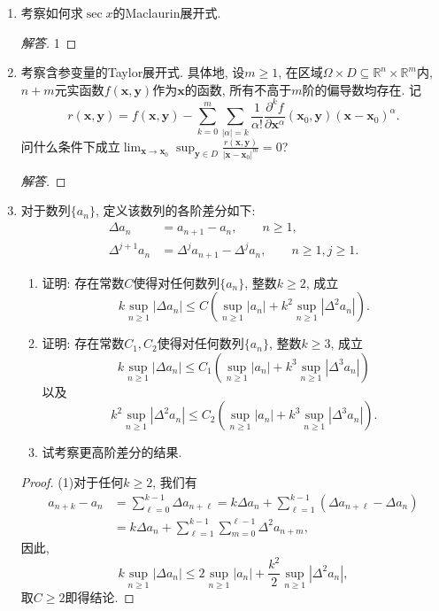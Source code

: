\begin{6b}
\begin{enumerate}
\item 考察如何求\(\sec x\)的Maclaurin展开式.
\begin{proof}[解答]
	1
\end{proof}
\item 考察含参变量的Taylor展开式. 具体地, 设\(m\geqslant 1\), 
在区域\(\varOmega\times D\subseteq\mathbb{R}^n\times\mathbb{R}^m\)内, 
\(n+m\)元实函数\(f(\boldsymbol{x},\boldsymbol{y})\)作为\(\boldsymbol{x}\)的函数, 
所有不高于\(m\)阶的偏导数均存在. 记
\[r(\boldsymbol{x},\boldsymbol{y})=f(\boldsymbol{x},\boldsymbol{y})-\sum_{k=0}^{m}\sum_{\left|\alpha\right|=k}\frac{1}{\alpha!}\frac{\partial^kf}{\partial\boldsymbol{x}^\alpha}(\boldsymbol{x}_0,\boldsymbol{y})(\boldsymbol{x}-\boldsymbol{x}_0)^\alpha.\]
问什么条件下成立\(\lim_{\boldsymbol{x}\rightarrow\boldsymbol{x}_0}\sup_{\boldsymbol{y}\in D}\frac{r(\boldsymbol{x},\boldsymbol{y})}{|\boldsymbol{x}-\boldsymbol{x}_0|^m}=0\)?
\begin{proof}[解答]
	
\end{proof}
\item 对于数列\(\{a_n\}\), 定义该数列的各阶差分如下:
\[\begin{split}
\Delta a_n&=a_{n+1}-a_n,\qquad n\geqslant 1,\\
\Delta^{j+1}a_n&=\Delta^{j}a_{n+1}-\Delta^{j}a_n,\qquad n\geqslant1,j\geqslant 1.
\end{split}\]
\begin{enumerate}[label=(\arabic*)]
\item 证明: 存在常数\(C\)使得对任何数列\(\{a_n\}\), 整数\(k\geqslant 2\), 成立
\[k\sup_{n\geqslant 1}|\Delta a_n|\leqslant C\left(\sup_{n\geqslant 1}|a_n|+k^2\sup_{n\geqslant 1}|\Delta^2 a_n|\right).\]
\item 证明: 存在常数\(C_1,C_2\)使得对任何数列\(\{a_n\}\), 整数\(k\geqslant 3\), 成立
\[k\sup_{n\geqslant 1}|\Delta a_n|\leqslant C_1\left(\sup_{n\geqslant 1}|a_n|+k^3\sup_{n\geqslant 1}|\Delta^3 a_n|\right)\]
以及\[k^2\sup_{n\geqslant 1}|\Delta^2 a_n|\leqslant C_2\left(\sup_{n\geqslant 1}|a_n|+k^3\sup_{n\geqslant 1}|\Delta^3 a_n|\right).\]
\item 试考察更高阶差分的结果.
\end{enumerate}
\begin{proof}
	(1)对于任何\(k\geqslant 2\), 我们有
    \begin{align*}
    a_{n+k}-a_n&=\sum_{\ell=0}^{k-1}\Delta a_{n+\ell}
    =k\Delta a_n+\sum_{\ell=1}^{k-1}\left(\Delta a_{n+\ell}-\Delta a_n\right)\\
    &=k\Delta a_n+\sum_{\ell=1}^{k-1}\sum_{m=0}^{\ell-1}\Delta^2a_{n+m},\end{align*}
    因此,\[k\sup_{n\geqslant 1}|\Delta a_n|\leqslant 2\sup_{n\geqslant 1}|a_n|+\frac{k^2}{2}\sup_{n\geqslant 1}|\Delta^2a_n|,\]
    取\(C\geqslant 2\)即得结论.
	

\end{proof}
\end{enumerate}
\end{6b}
